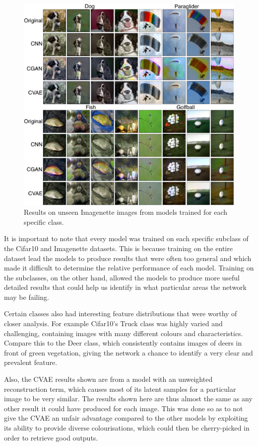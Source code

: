 \documentclass{l4proj}
\begin{document}
\begin{figure}[H]
    \centering
    \includegraphics[width=1.0\linewidth]{images/ImagenetteEval.png}    
    \caption{Results on unseen Imagenette images from models trained for each specific class.}
    \label{fig:imagenetteeval}
\end{figure}

It is important to note that every model was trained on each specific subclass of the Cifar10 and Imagenette datasets. This is because training on the entire dataset lead the models to produce results that were often too general and which made it difficult to determine the relative performance of each model. Training on the subclasses, on the other hand, allowed the models to produce more useful detailed results that could help us identify in what particular areas the network may be failing. 

Certain classes also had interesting feature distributions that were worthy of closer analysis. For example Cifar10's Truck class was highly varied and challenging, containing images with many different colours and characteristics. Compare this to the Deer class, which consistently contains images of deers in front of green vegetation, giving the network a chance to identify a very clear and prevalent feature.

Also, the CVAE results shown are from a model with an unweighted reconstruction term, which causes most of its latent samples for a particular image to be very similar. The results shown here are thus almost the same as any other result it could have produced for each image. This was done so as to not give the CVAE an unfair advantage compared to the other models by exploiting its ability to provide diverse colourisations, which could then be cherry-picked in order to retrieve good outputs. 
\end{document}
